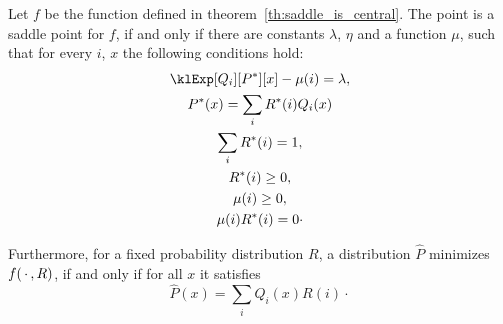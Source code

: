 \begin{lemma}
    \label{lm:saddle_conditions}
    Let $f$ be the function defined in theorem~\ref{th:saddle_is_central}.
    The point \saddle is a saddle point for $f$, if and only if there are constants $\lambda$, $\eta$ and a
    function $\mu$, such that for every $i$, $x$ the following conditions hold:
    \begin{gather}
        \label{eq:kkt_lambda}
        \klExp[Q_i][\saddP][x] - \mu(i) = \lambda, \\
        \label{eq:kkt_w_avg}
        \saddP(x) = \sum_i \saddR(i) Q_i(x) \\
        \label{eq:kkt_r_sums_one}
        \sum_i \saddR(i) = 1, \\
        \label{eq:saddle_lm_r_geq_0}
        \saddR(i) \geq 0, \\
        \nonumber
        \mu(i) \geq 0, \\
        \label{eq:saddle_lm_rmu_is_zero}
        \mu(i) \saddR(i) = 0 \cdot
    \end{gather}

    Furthermore, for a fixed probability distribution $R$, a distribution $\hat{P}$ minimizes $f(\, \cdot \,,R)$, if and
    only if for all $x$ it satisfies
    \begin{equation}
        \label{eq:saddle_lm_minimizer_dist}
        \hat{P}(x) = \sum_i Q_i(x)R(i) \cdot
    \end{equation}
\end{lemma}

